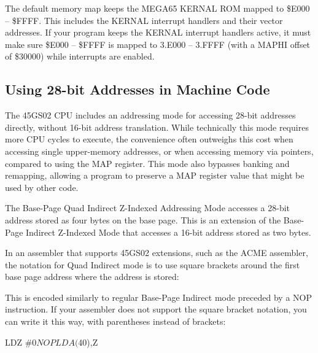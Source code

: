 The default memory map keeps the MEGA65 KERNAL ROM mapped to \$E000 -- \$FFFF.
This includes the KERNAL interrupt handlers and their vector addresses. If
your program keeps the KERNAL interrupt handlers active, it must make sure
\$E000 -- \$FFFF is mapped to 3.E000 -- 3.FFFF (with a MAPHI offset of
\$30000) while interrupts are enabled.

\subsection{Using 28-bit Addresses in Machine Code}

The 45GS02 CPU includes an addressing mode for accessing 28-bit addresses
directly, without 16-bit address translation. While technically this mode
requires more CPU cycles to execute, the convenience often outweighs this cost
when accessing single upper-memory addresses, or when accessing memory via
pointers, compared to using the MAP register. This mode also bypasses banking and
remapping, allowing a program to preserve a MAP register value that might be
used by other code.

The Base-Page Quad Indirect Z-Indexed Addressing Mode accesses a 28-bit address
stored as four bytes on the base page. This is an extension of the Base-Page
Indirect Z-Indexed Mode that accesses a 16-bit address stored as two bytes.

In an assembler that supports 45GS02 extensions, such as the ACME assembler, the
notation for Quad Indirect mode is to use square brackets around the first base
page address where the address is stored:


This is encoded similarly to regular Base-Page Indirect mode preceded by a NOP
instruction. If your assembler does not support the square bracket notation,
you can write it this way, with parentheses instead of brackets:

\begin{asmcode}
LDZ #$0
NOP
LDA ($40),Z
\end{asmcode}

